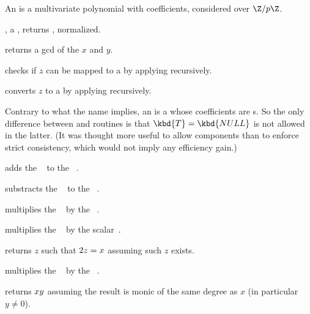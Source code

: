 An  is a multivariate polynomial with  coefficients,
considered over $\Z/p\Z$.

,  a , returns , normalized.

 returns a gcd of the  $x$ and $y$.

 checks if $z$ can be mapped to a 
by applying  recursively.

 converts $z$ to a 
by applying  recursively.

Contrary to what the name implies, an  is a  whose
coefficients are s. So the only difference between  and
 routines is that $\kbd{T} = \kbd{NULL}$ is not allowed in the
latter. (It was thought more useful to allow  components than to
enforce strict consistency, which would not imply any efficiency gain.)



 adds the
~ to the ~.

 substracts the
~ to the ~.




 multiplies the
~ by the ~.

 multiplies the
~ by the scalar~.

 returns $z$ such that $2\*z = x$
assuming such $z$ exists.

 multiplies the
~ by the ~.

returns $x\*y$ assuming the result is monic of the same degree as $x$ (in
particular $y\neq 0$).


